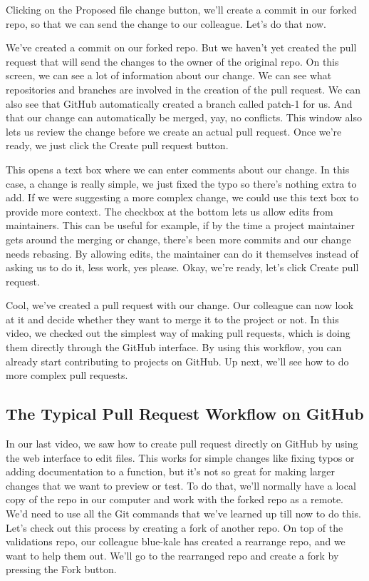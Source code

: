 	Clicking on the Proposed file change button, we'll create a commit in our forked repo, so that we can send the change to our colleague. Let's do that now.
	
	We've created a commit on our forked repo. But we haven't yet created the pull request that will send the changes to the owner of the original repo. On this screen, we can see a lot of information about our change. We can see what repositories and branches are involved in the creation of the pull request. We can also see that GitHub automatically created a branch called patch-1 for us. And that our change can automatically be merged, yay, no conflicts. This window also lets us review the change before we create an actual pull request. Once we're ready, we just click the Create pull request button.
	
	This opens a text box where we can enter comments about our change. In this case, a change is really simple, we just fixed the typo so there's nothing extra to add. If we were suggesting a more complex change, we could use this text box to provide more context. The checkbox at the bottom lets us allow edits from maintainers. This can be useful for example, if by the time a project maintainer gets around the merging or change, there's been more commits and our change needs rebasing. By allowing edits, the maintainer can do it themselves instead of asking us to do it, less work, yes please. Okay, we're ready, let's click Create pull request.
	
	Cool, we've created a pull request with our change. Our colleague can now look at it and decide whether they want to merge it to the project or not. In this video, we checked out the simplest way of making pull requests, which is doing them directly through the GitHub interface. By using this workflow, you can already start contributing to projects on GitHub. Up next, we'll see how to do more complex pull requests.
	
	\subsection{The Typical Pull Request Workflow on GitHub}
	
	
	In our last video, we saw how to create pull request directly on GitHub by using the web interface to edit files. This works for simple changes like fixing typos or adding documentation to a function, but it's not so great for making larger changes that we want to preview or test. To do that, we'll normally have a local copy of the repo in our computer and work with the forked repo as a remote. We'd need to use all the Git commands that we've learned up till now to do this. Let's check out this process by creating a fork of another repo. On top of the validations repo, our colleague blue-kale has created a rearrange repo, and we want to help them out. We'll go to the rearranged repo and create a fork by pressing the Fork button.
	
